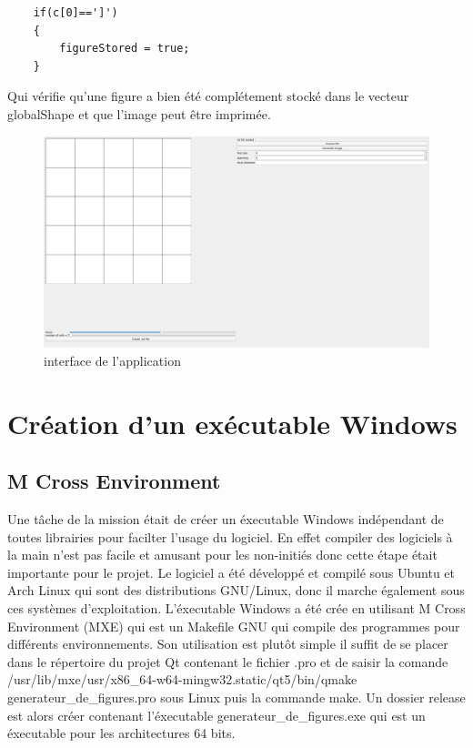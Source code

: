 \documentclass{article}
\begin{document}
\begin{verbatim}
	if(c[0]==']')
	{
		figureStored = true;
	}
\end{verbatim}
Qui vérifie qu'une figure a bien été complétement stocké dans le vecteur globalShape et que l'image peut être imprimée. 


\begin{figure}[!h]
	\centering
	\includegraphics[scale=0.2]{./images/interface.png}
	\caption{interface de l'application}
	\label{fig:interface}
\end{figure}

\section{Création d'un exécutable Windows}
\subsection{M Cross Environment}
Une tâche de la mission était de créer un éxecutable Windows indépendant de toutes librairies pour facilter l'usage du logiciel. En effet compiler des logiciels à la main n'est pas facile et amusant pour les non-initiés donc cette étape était importante pour le projet. Le logiciel a été développé et compilé sous Ubuntu et Arch Linux qui sont des distributions GNU/Linux, donc il marche également sous ces systèmes d'exploitation. L'éxecutable Windows a été crée en utilisant M Cross Environment (MXE) qui est un Makefile GNU qui compile des programmes pour différents environnements. Son utilisation est plutôt simple il suffit de se placer dans le répertoire du projet Qt contenant le fichier .pro et de saisir la comande /usr/lib/mxe/usr/x86\_64-w64-mingw32.static/qt5/bin/qmake generateur\_de\_figures.pro sous Linux puis la commande make. Un dossier release est alors créer contenant l'éxecutable generateur\_de\_figures.exe qui est un éxecutable pour les architectures 64 bits.
\end{document}
